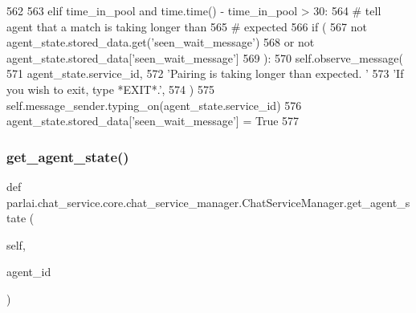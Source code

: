 \begin{DoxyCode}
562 
563             \textcolor{keywordflow}{elif} time\_in\_pool \textcolor{keywordflow}{and} time.time() - time\_in\_pool > 30:
564                 \textcolor{comment}{# tell agent that a match is taking longer than}
565                 \textcolor{comment}{# expected}
566                 \textcolor{keywordflow}{if} (
567                     \textcolor{keywordflow}{not} agent\_state.stored\_data.get(\textcolor{stringliteral}{'seen\_wait\_message'})
568                     \textcolor{keywordflow}{or} \textcolor{keywordflow}{not} agent\_state.stored\_data[\textcolor{stringliteral}{'seen\_wait\_message'}]
569                 ):
570                     self.observe\_message(
571                         agent\_state.service\_id,
572                         \textcolor{stringliteral}{'Pairing is taking longer than expected. '}
573                         \textcolor{stringliteral}{'If you wish to exit, type *EXIT*.'},
574                     )
575                     self.message\_sender.typing\_on(agent\_state.service\_id)
576                     agent\_state.stored\_data[\textcolor{stringliteral}{'seen\_wait\_message'}] = \textcolor{keyword}{True}
577 
\end{DoxyCode}
\mbox{\label{classparlai_1_1chat__service_1_1core_1_1chat__service__manager_1_1ChatServiceManager_ac88107eb2a55878dad8ceb4c90acff5b}} 
\subsubsection{\texorpdfstring{get\+\_\+agent\+\_\+state()}{get\_agent\_state()}}
{\footnotesize\ttfamily def parlai.\+chat\+\_\+service.\+core.\+chat\+\_\+service\+\_\+manager.\+Chat\+Service\+Manager.\+get\+\_\+agent\+\_\+state (\begin{DoxyParamCaption}\item[{}]{self,  }\item[{}]{agent\+\_\+id }\end{DoxyParamCaption})}

